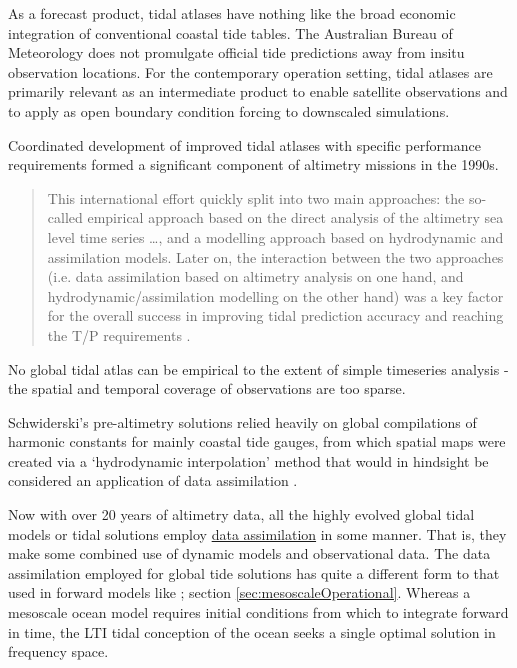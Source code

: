 As a forecast product, tidal atlases have nothing like the broad economic integration of conventional coastal tide tables.  The Australian Bureau of Meteorology does not promulgate official tide predictions away from insitu observation locations. 
For the contemporary operation setting, tidal atlases are primarily relevant as an intermediate product to enable satellite observations and to apply as open boundary condition forcing to downscaled simulations.


Coordinated development of improved tidal atlases with specific performance requirements formed a significant component of altimetry missions in the 1990s.
\begin{quotation} \noindent
This international effort quickly split into two main approaches: the so-called empirical approach based on the direct analysis of the altimetry sea level time series \dots{}, and a modelling approach based on hydrodynamic and assimilation models. Later on, the interaction between the two approaches (i.e. data assimilation based on altimetry analysis on one hand, and hydrodynamic/assimilation modelling on the other hand) was a key factor for the overall success in improving tidal prediction accuracy and reaching the T/P requirements \citep[pp394]{Lefevre:2011dg}.
\end{quotation}

No global tidal atlas can be empirical to the extent of simple timeseries analysis - the spatial and temporal coverage of observations are too sparse.

Schwiderski's pre-altimetry solutions relied heavily on global compilations of harmonic constants for mainly coastal tide gauges, from which spatial maps were created via a `hydrodynamic interpolation' method that would in hindsight be considered an application of data assimilation \citep[pp822]{Egbert:1994wz}.

Now with over 20 years of altimetry data, all the highly evolved global tidal models or tidal solutions employ \underline{data assimilation} in some manner.  That is, they make some combined use of dynamic models and observational data.  
The data assimilation employed for global tide solutions has quite a different form to that used in forward models like \BL{}; section \ref{sec:mesoscaleOperational}.  Whereas a mesoscale ocean model requires initial conditions from which to integrate forward in time, the LTI tidal conception of the ocean seeks a single optimal solution in frequency space. 


